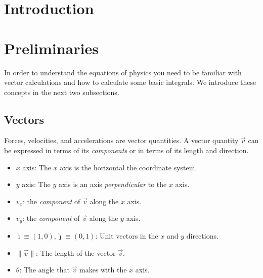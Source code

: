 \documentclass[letterpaper,9pt,journal]{IEEEtran}
\newcommand{\dokuitalic}[1]{\textsl{#1}}
\newcommand{\dokuitem}{\item}
\begin{document}

\section{Introduction}




%



\section{Preliminaries}

In order to understand the equations of physics you need to be familiar with
vector calculations and how to calculate some basic integrals. 
We introduce these concepts in the next two subsections.

\vspace{-3mm}
\subsection{Vectors}

Forces, velocities, and accelerations are vector quantities.
A vector quantity $\vec{v}$ can be expressed in terms of its \dokuitalic{components}
or in terms of its length and direction.
\begin{itemize}
\dokuitem  $x$ axis:  The $x$ axis is the horizontal the coordinate system.
\dokuitem  $y$ axis: The $y$ axis is an axis \dokuitalic{perpendicular} to the $x$ axis.
\dokuitem  $v_x$: the \dokuitalic{component} of $\vec{v}$ along the $x$ axis.
\dokuitem  $v_y$: the \dokuitalic{component} of $\vec{v}$ along the $y$ axis.
\dokuitem  $\hat{\imath}\equiv(1,0),\hat{\jmath}\equiv(0,1)$: Unit vectors in the $x$ and $y$ directions. 
\dokuitem  $\|\vec{v}\|$: The length of the vector $\vec{v}$.
\dokuitem	 $\theta$: The angle that $\vec{v}$ makes with the $x$ axis.
\end{itemize}
\end{document}
